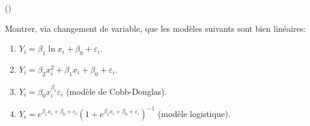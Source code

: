\begin{exercice}\label{exo2-2} (\coolexo)

Montrer, via changement de variable, que les mod\`eles suivants sont bien lin\'eaires:

\begin{enumerate}

\item $Y_i = \beta_1 \ln x_i + \beta_0 + \varepsilon_i$.

\item $Y_i = \beta_2 x_i^2 + \beta_1 x_i + \beta_0 + \varepsilon_i$.

\item $Y_i = \beta_0 x_i^{\beta_1}\varepsilon_i$ (mod\`ele de Cobb-Douglas).

\item $Y_i = e^{\beta_1 x_i + \beta_0 + \varepsilon_i}  (1+e^{\beta_1 x_i + \beta_0 + \varepsilon_i})^{-1}$ (mod\`ele logistique).

\end{enumerate}

\end{exercice}
